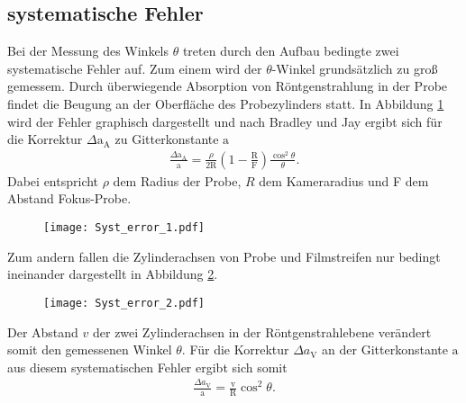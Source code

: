 \subsection{systematische Fehler}
Bei der Messung des Winkels $\theta$
treten durch den Aufbau bedingte zwei systematische Fehler auf.
Zum einem wird der $\theta$-Winkel grundsätzlich zu groß gemessem.
Durch überwiegende Absorption von Röntgenstrahlung in der Probe
findet die Beugung an der Oberfläche des
Probezylinders statt. In Abbildung \ref{fig:error1} wird
der Fehler graphisch dargestellt und nach Bradley und Jay
ergibt sich für die Korrektur
$\Delta \mathrm{a}_\mathrm{A}$
zu Gitterkonstante $\mathrm{a}$
\begin{align}
  \frac{\Delta \mathrm{a}_\mathrm{A}}{\mathrm{a}}=\frac{\rho}{2\mathrm{R}}\left(1-\frac{\mathrm{R}}{\mathrm{F}}\right)\frac{\cos^2\theta}{\theta}. \label{eqn:sys1}
\end{align}
Dabei entspricht $\rho$ dem Radius der Probe, $R$ dem Kameraradius
und F dem Abstand Fokus-Probe.

 \begin{figure}
   \centering
   \texttt{[image: Syst\_error\_1.pdf]}
   \caption{  }
   \label{fig:error1}
  \end{figure}

Zum andern fallen die Zylinderachsen von Probe und Filmstreifen
nur bedingt ineinander dargestellt in Abbildung \ref{fig:error2}.

\begin{figure}
  \centering
  \texttt{[image: Syst\_error\_2.pdf]}
  \caption{  }
  \label{fig:error2}
\end{figure}
Der Abstand $v$ der zwei Zylinderachsen in der Röntgenstrahlebene
verändert somit den gemessenen Winkel $\theta$.
Für die Korrektur $\Delta a_\mathrm{V}$ an der Gitterkonstante $\mathrm{a}$
aus diesem systematischen Fehler ergibt sich somit
\begin{align}
  \frac{\Delta a_\mathrm{V}}{\mathrm{a}}=\frac{\mathrm{v}}{\mathrm{R}} \cos^2 \theta. \label{eqn:sys2}
\end{align}
